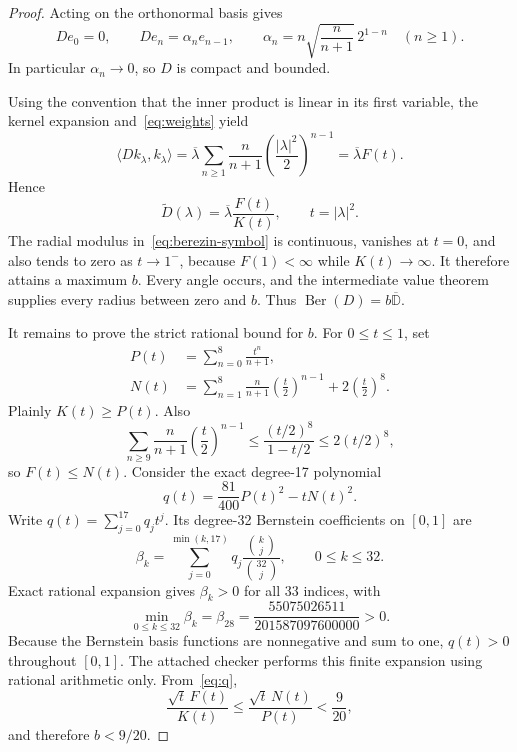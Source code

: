 \documentclass[11pt]{amsart}
\theoremstyle{definition}
\newcommand{\Ber}{\operatorname{Ber}}
\newcommand{\Disk}{\overline{\mathbb D}}
\begin{document}
\begin{proof}
Acting on the orthonormal basis gives
\begin{equation}\label{eq:weights}
 De_0=0,\qquad
 De_n=\alpha_ne_{n-1},\qquad
 \alpha_n=n\sqrt{\frac n{n+1}}\,2^{1-n}\quad(n\ge1).
\end{equation}
In particular \(\alpha_n\to0\), so \(D\) is compact and bounded.

Using the convention that the inner product is linear in its first variable,
the kernel expansion and~\eqref{eq:weights} yield
\[
 \langle Dk_\lambda,k_\lambda\rangle
 =\overline\lambda\sum_{n\ge1}\frac n{n+1}
       \left(\frac{|\lambda|^2}{2}\right)^{n-1}
 =\overline\lambda F(t).
\]
Hence
\begin{equation}\label{eq:berezin-symbol}
 \widetilde D(\lambda)
 =\overline\lambda\frac{F(t)}{K(t)},\qquad t=|\lambda|^2.
\end{equation}
The radial modulus in~\eqref{eq:berezin-symbol} is continuous, vanishes at
\(t=0\), and also tends to zero as \(t\to1^-\), because \(F(1)<\infty\)
while \(K(t)\to\infty\).  It therefore attains a maximum \(b\).  Every
angle occurs, and the intermediate value theorem supplies every radius
between zero and \(b\).  Thus \(\Ber(D)=b\Disk\).

It remains to prove the strict rational bound for \(b\).  For \(0\le t\le1\),
set
\begin{align*}
 P(t)&=\sum_{n=0}^{8}\frac{t^n}{n+1},\\
 N(t)&=\sum_{n=1}^{8}\frac n{n+1}\left(\frac t2\right)^{n-1}
        +2\left(\frac t2\right)^8.
\end{align*}
Plainly \(K(t)\ge P(t)\).  Also
\[
 \sum_{n\ge9}\frac n{n+1}\left(\frac t2\right)^{n-1}
 \le\frac{(t/2)^8}{1-t/2}\le2(t/2)^8,
\]
so \(F(t)\le N(t)\).  Consider the exact degree-17 polynomial
\begin{equation}\label{eq:q}
 q(t)=\frac{81}{400}P(t)^2-tN(t)^2.
\end{equation}
Write \(q(t)=\sum_{j=0}^{17}q_jt^j\).  Its degree-32 Bernstein
coefficients on \([0,1]\) are
\[
 \beta_k=\sum_{j=0}^{\min(k,17)}q_j
          \frac{\binom{k}{j}}{\binom{32}{j}},\qquad 0\le k\le32.
\]
Exact rational expansion gives \(\beta_k>0\) for all 33 indices, with
\[
 \min_{0\le k\le32}\beta_k
 =\beta_{28}
 =\frac{55075026511}{201587097600000}>0.
\]
Because the Bernstein basis functions are nonnegative and sum to one,
\(q(t)>0\) throughout \([0,1]\).  The attached checker performs this finite
expansion using rational arithmetic only.  From~\eqref{eq:q},
\[
 \frac{\sqrt t\,F(t)}{K(t)}
 \le\frac{\sqrt t\,N(t)}{P(t)}<\frac9{20},
\]
and therefore \(b<9/20\).


\end{proof}
\end{document}
